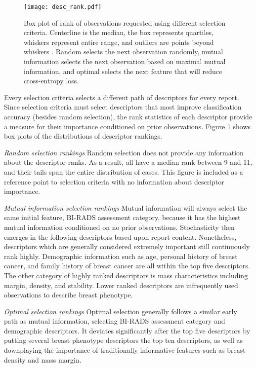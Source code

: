 \begin{figure}[h]
	\centering
	\texttt{[image: desc\_rank.pdf]}
	\caption[Ranking descriptor importance with selection criteria]{Box plot of rank of observations requested using different selection criteria. Centerline is the median, the box represents quartiles, whiskers represent entire range, and outliers are points beyond whiskers . Random selects the next observation randomly, mutual information selects the next observation based on maximal mutual information, and optimal selects the next feature that will reduce cross-entropy loss.}
	\label{fig:feedback_mammo_ranks}
\end{figure}

Every selection criteria selects a different path of descriptors for every report. Since selection criteria must select descriptors that most improve classification accuracy (besides random selection), the rank statistics of each descriptor provide a measure for their importance conditioned on prior observations. Figure \ref{fig:feedback_mammo_ranks} shows box plots of the distributions of descriptor rankings.


\emph{Random selection rankings}
Random selection does not provide any information about the descriptor ranks. As a result, all have a median rank between 9 and 11, and their tails span the entire distribution of cases. This figure is included as a reference point to selection criteria with no information about descriptor importance.

\emph{Mutual information selection rankings}
Mutual information will always select the same initial feature, BI-RADS assessment category, because it has the highest mutual information conditioned on no prior observations. Stochasticity then emerges in the following descriptors based upon report content. Nonetheless, descriptors which are generally considered extremely important still continuously rank highly. Demographic information such as age, personal history of breast cancer, and family history of breast cancer are all within the top five descriptors. The other category of highly ranked descriptors is mass characteristics including margin, density, and stability. Lower ranked descriptors are infrequently used observations to describe breast phenotype.

\emph{Optimal selection rankings}
Optimal selection generally follows a similar early path as mutual information, selecting BI-RADS assessment category and demographic descriptors. It deviates significantly after the top five descriptors by putting several breast phenotype descriptors the top ten descriptors, as well as downplaying the importance of traditionally informative features such as breast density and mass margin.

